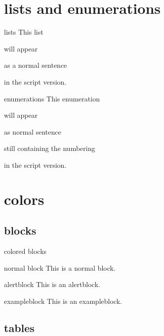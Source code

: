 \section{lists and enumerations}

\begin{frame}{lists}
  This list
  \begin{beameritemize}
    \item will appear
    \item as a normal sentence
  \end{beameritemize}
  in the script version.
\end{frame}

\begin{frame}{enumerations}
  This enumeration
  \begin{beamerenumerate}
    \item will appear
    \item as normal sentence
    \item still containing the numbering 
  \end{beamerenumerate}
  in the script version.
\end{frame}

\section{colors}

\subsection{blocks}

\begin{frame}{colored blocks}
  \begin{block}{normal block}
    This is a normal block.
  \end{block}
  
  \begin{alertblock}{alertblock}
    This is an alertblock.
  \end{alertblock}
  
  \begin{exampleblock}{exampleblock}
    This is an exampleblock.
  \end{exampleblock}
\end{frame}

\subsection{tables}

